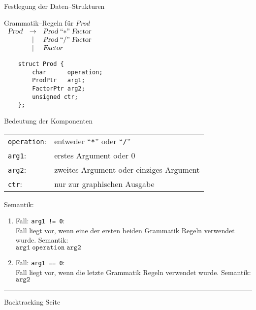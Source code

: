 
\begin{slide}{}
\normalsize

\begin{center}
Festlegung der Daten--Strukturen
\end{center}
\vspace*{0.5cm}

\footnotesize
Grammatik--Regeln f\"ur \textsl{Prod} \\[0.3cm]
\hspace*{1.3cm} 
$\begin{array}{lcl}
         \textsl{Prod} & \rightarrow & \textsl{Prod}\; ``\mathtt{*}\cq \; \textsl{Factor} \\
                       & |           & \textsl{Prod}\; ``\mathtt{/}\cq \; \textsl{Factor} \\
                       & |           & \textsl{Factor}                                    \\
 \end{array}$    

\begin{verbatim}
    struct Prod {
        char      operation; 
        ProdPtr   arg1;
        FactorPtr arg2;
        unsigned ctr; 
    };
\end{verbatim}

Bedeutung der Komponenten \\[0.3cm]
\hspace*{0.3cm} 
\begin{tabular}{ll}
 \texttt{operation}: & entweder ``\texttt{*}'' oder ``\texttt{/}'' \\[0.3cm]
 \texttt{arg1}:      & erstes Argument oder 0                      \\[0.3cm]
 \texttt{arg2}:      & zweites Argument oder einziges Argument \\[0.3cm]
 \texttt{ctr}:       & nur zur graphischen Ausgabe 
\end{tabular}

Semantik: 
\begin{enumerate}
\item Fall: \texttt{arg1 != 0}: \\[0.3cm]
      Fall liegt vor, wenn eine der ersten beiden Grammatik Regeln verwendet wurde.
      Semantik: \\[0.3cm]
      \hspace*{1.3cm}  $\mathtt{arg1} \; \mathtt{operation} \; \mathtt{arg2}$
\item Fall: \texttt{arg1 == 0}: \\[0.3cm]
      Fall liegt vor, wenn die letzte Grammatik Regeln verwendet wurde.
      Semantik: \\[0.3cm]
      \hspace*{1.3cm}  $\mathtt{arg2}$
\end{enumerate}

\vspace*{\fill}
\tiny \addtocounter{mypage}{1}
\rule{17cm}{1mm}
Backtracking  \hspace*{\fill} Seite 
\end{slide}
